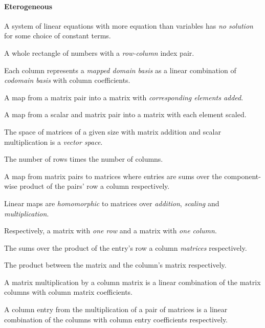 \begin{multicols}{3}
  \paragraph{\textbf{Eterogeneous}}
  A system of linear equations with more equation than variables has \textit{no solution} for some choice of constant terms.
  
  A whole rectangle of numbers with a \textit{row-column} index pair.
  
  Each column represents a \textit{mapped domain basis} as a linear combination of \textit{codomain basis} with column coefficients.

  A map from a matrix pair into a matrix with \textit{corresponding elements added}.

  A map from a scalar and matrix pair into a matrix with each element scaled.
  
  The space of matrices of a given size with matrix addition and scalar multiplication is a \textit{vector space}.
  
  The number of rows times the number of columns.

  A map from matrix pairs to matrices where entries are sums over the component-wise product of
  the pairs' row a column respectively.
  
  Linear maps are \textit{homomorphic} to matrices over \textit{addition}, \textit{scaling} and \textit{multiplication}.

  Respectively, a matrix with \textit{one row} and a matrix with \textit{one column}.

  The sums over the product of the entry's row a column \textit{matrices}
  respectively.

  The product between the matrix and the column's matrix respectively.

  A matrix multiplication by a column matrix is a linear combination of the
  matrix columns with column matrix coefficients.

  A column entry from
  the multiplication of a pair of matrices is
  a linear combination of the columns
  with column entry coefficients respectively.
  

\end{multicols}
